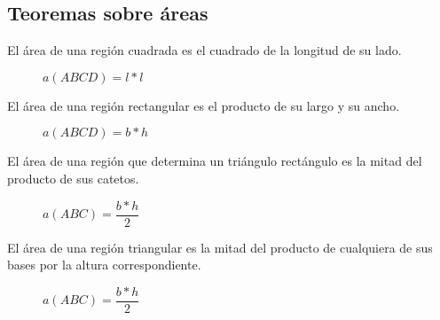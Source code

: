 \clearpage

\subsection{Teoremas sobre áreas}

\begin{postulate}
    El área de una región cuadrada es el cuadrado de la longitud de su lado.

    \begin{figure}[!h]
        \centering
        
        \caption{$a(ABCD) = l * l$}
        \label{fig:area-cuadrado}
    \end{figure}
    
\end{postulate}

\begin{theorem}
    El área de una región rectangular es el producto de su largo y su ancho.

    \begin{figure}[!h]
        \centering
        
        \caption{$a(ABCD) = b * h$}
        \label{fig:area-rectangular}
    \end{figure}
    
\end{theorem}

\begin{theorem}
    El área de una región que determina un triángulo rectángulo es la mitad del producto de sus catetos.

    \begin{figure}[!h]
        \centering
        
        \caption{$a(ABC) = \dfrac{b * h}{2}$}
        \label{fig:area-triangular}
    \end{figure}
    
\end{theorem}

\begin{theorem}
    El área de una región triangular es la mitad del producto de cualquiera de sus bases por la altura correspondiente.

    \begin{figure}[!h]
        \centering
        
        \caption{$a(ABC) = \dfrac{b * h}{2}$}
        \label{fig:area-triangular-cualquiera}
    \end{figure}
    
\end{theorem}

